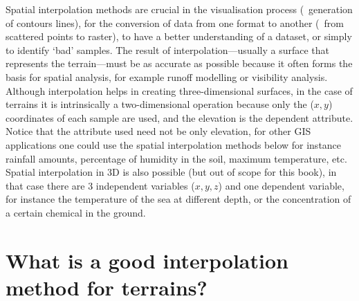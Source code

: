 Spatial interpolation methods are crucial in the visualisation process (\eg\ generation of contours lines), for the conversion of data from one format to another (\eg\ from scattered points to raster), to have a better understanding of a dataset, or simply to identify `bad' samples. 
The result of interpolation---usually a surface that represents the terrain---must be as accurate as possible because it often forms the basis for spatial analysis, for example runoff modelling or visibility analysis. 
Although interpolation helps in creating three-dimensional surfaces, in the case of terrains it is intrinsically a two-dimensional operation because only the ($x,y$) coordinates of each sample are used, and the elevation is the dependent attribute.
Notice that the attribute used need not be only elevation, for other GIS applications one could use the spatial interpolation methods below for instance rainfall amounts, percentage of humidity in the soil, maximum temperature, etc. 
Spatial interpolation in 3D is also possible (but out of scope for this book), in that case there are 3 independent variables ($x,y,z$) and one dependent variable, for instance the temperature of the sea at different depth, or the concentration of a certain chemical in the ground.


%


\section{What is a good interpolation method for terrains?}%
\label{sec:interpol_properties}

